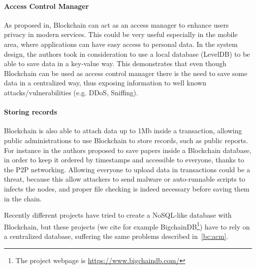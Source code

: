 \paragraph*{Access Control Manager}
\label{bc:acm}

As proposed in\cite{dp15}, Blockchain can act as an access manager to enhance
users privacy in modern services. This could be very useful especially in the
mobile area, where applications can have easy access to personal data. In the
system design, the authors took in consideration to use a local database
(LevelDB) to be able to save data in a key-value way. This demonstrates
that even though Blockchain can be used as access control manager there is the
need to save some data in a centralized way, thus exposing information to
well known attacks/vulnerabilities (e.g. DDoS, Sniffing).

\paragraph*{Storing records}

Blockchain is also able to attach data up to 1Mb \cite{ectel16} inside a
transaction, allowing public administrations to use Blockchain to store
records, such as public reports. For instance in\cite{ectel16} the authors
proposed to save papers inside a Blockchain database, in order to keep it
ordered by timestamps and accessible to everyone, thanks to the P2P networking.
Allowing everyone to upload data in transactions could be a threat, because this
allow attackers to send malware or auto-runnable scripts to infects the nodes,
and proper file checking is indeed necessary before saving them in the chain.


Recently different projects have tried to create a NoSQL-like database with
Blockchain, but these projects (we cite for example BigchainDB\footnote{The
project webpage is \url{https://www.bigchaindb.com/}}) have to rely on a
centralized database, suffering the same problems described in~\ref{bc:acm}.
